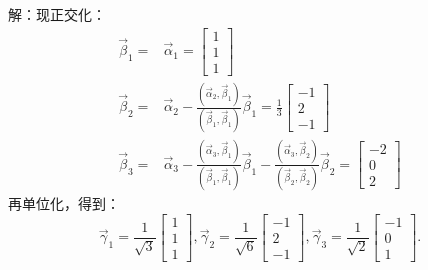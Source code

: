 \documentclass[a4paper]{book}
\begin{document}
解：现正交化：
\begin{align*}
\vec{\beta}_1=&\vec{\alpha}_1=\begin{bmatrix}1\\1\\1\end{bmatrix}\\
\vec{\beta}_2=&\vec{\alpha}_2-\frac{(\vec{\alpha}_2,\vec{\beta}_1)}{(\vec{\beta}_1,\vec{\beta}_1)}\vec{\beta}_1
              =\frac{1}{3}\begin{bmatrix}-1\\2\\-1\end{bmatrix}\\
\vec{\beta}_3=&\vec{\alpha}_3-\frac{(\vec{\alpha}_3,\vec{\beta}_1)}{(\vec{\beta}_1,\vec{\beta}_1)}\vec{\beta}_1-
              \frac{(\vec{\alpha}_3,\vec{\beta}_2)}{(\vec{\beta}_2,\vec{\beta}_2)}\vec{\beta}_2
              =\begin{bmatrix}-2\\0\\2\end{bmatrix}
\end{align*}
再单位化，得到：
\begin{equation*}
\vec{\gamma}_1=\frac{1}{\sqrt{3}}\begin{bmatrix}1\\1\\1\end{bmatrix},
\vec{\gamma}_2=\frac{1}{\sqrt{6}}\begin{bmatrix}-1\\2\\-1\end{bmatrix},
\vec{\gamma}_3=\frac{1}{\sqrt{2}}\begin{bmatrix}-1\\0\\1\end{bmatrix}.
\end{equation*}
\end{document}

